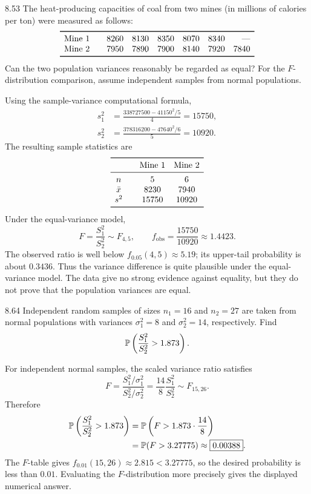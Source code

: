 \documentclass[11pt,oneside]{article}
\begin{document}
\begin{exercise}{8.53}
The heat-producing capacities of coal from two mines (in millions of calories per ton) were measured as follows:
\[
\begin{array}{c@{\qquad}rrrrrr}\toprule
\text{Mine 1}&8260&8130&8350&8070&8340&\text{---}\\
\text{Mine 2}&7950&7890&7900&8140&7920&7840\\\bottomrule
\end{array}
\]
Can the two population variances reasonably be regarded as equal? For the $F$-distribution comparison, assume independent samples from normal populations.
\end{exercise}
\begin{solution}
Using the sample-variance computational formula,
\[
\begin{aligned}
s_1^2&=\frac{338727500-41150^2/5}{4}=15750, \\
s_2^2&=\frac{378316200-47640^2/6}{5}=10920.
\end{aligned}
\]
The resulting sample statistics are
\[
\begin{array}{c@{\qquad}cc}\toprule
&\text{Mine 1}&\text{Mine 2}\\\midrule
n&5&6\\
\bar x&8230&7940\\
s^2&15750&10920\\\bottomrule
\end{array}
\]
Under the equal-variance model,
\[
F=\frac{S_1^2}{S_2^2}\sim F_{4, 5}, \qquad
f_{\mathrm{obs}}=\frac{15750}{10920}\approx1.4423.
\]
The observed ratio is well below $f_{0.05}(4, 5)\approx5.19$; its upper-tail probability is about $0.3436$. Thus the variance difference is quite plausible under the equal-variance model. The data give no strong evidence against equality, but they do not prove that the population variances are equal.
\end{solution}

\begin{exercise}{8.64}
Independent random samples of sizes $n_1=16$ and $n_2=27$ are taken from normal populations with variances $\sigma_1^2=8$ and $\sigma_2^2=14$, respectively. Find
\[
\mathbb{P}\left(\frac{S_1^2}{S_2^2}>1.873\right).
\]
\end{exercise}
\begin{solution}
For independent normal samples, the scaled variance ratio satisfies
\[
F=\frac{S_1^2/\sigma_1^2}{S_2^2/\sigma_2^2}
=\frac{14}{8}\frac{S_1^2}{S_2^2}\sim F_{15, 26}.
\]
Therefore
\[
\begin{aligned}
\mathbb{P}\left(\frac{S_1^2}{S_2^2}>1.873\right)
&=\mathbb{P}\left(F>1.873\cdot\frac{14}{8}\right)\\
&=\mathbb{P}(F>3.27775)
\approx\boxed{0.00388}.
\end{aligned}
\]
The $F$-table gives $f_{0.01}(15, 26)\approx2.815<3.27775$, so the desired probability is less than $0.01$. Evaluating the $F$-distribution more precisely gives the displayed numerical answer.
\end{solution}
\end{document}
